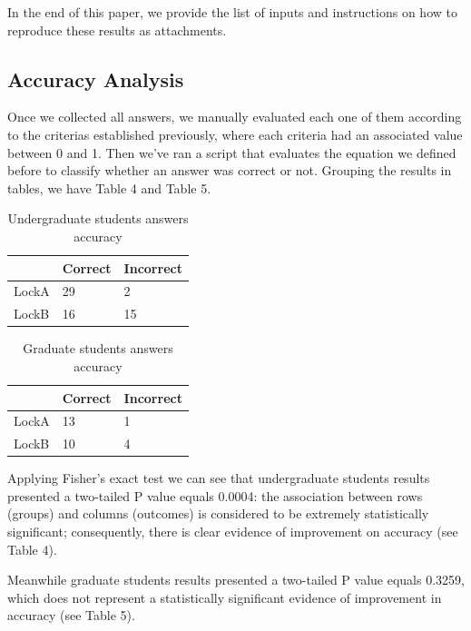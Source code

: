 In the end of this paper, we provide the list of inputs and instructions on how to reproduce these results as attachments.

\subsection{Accuracy Analysis}

Once we collected all answers, we manually evaluated each one of them according to the criterias established previously, where each criteria had an associated value between 0 and 1. Then we've ran a script that evaluates the equation we defined before to classify whether an answer was correct or not. Grouping the results in tables, we have Table 4 and Table 5.

\begin{table}
\begin{center}
\caption{Undergraduate students answers accuracy}
\begin{tabular}{|l|l|l|}
\hline
 & Correct & Incorrect\\
\hline
LockA & 29 & 2\\
LockB & 16 & 15\\
\hline
\end{tabular}
\end{center}
\end{table}

\begin{table}
\begin{center}
\caption{Graduate students answers accuracy}
\begin{tabular}{|l|l|l|}
\hline
 & Correct & Incorrect\\
\hline
LockA & 13 & 1\\
LockB & 10 & 4\\
\hline
\end{tabular}
\end{center}
\end{table}

Applying Fisher's exact test we can see that undergraduate students results presented a two-tailed P value equals 0.0004: the association between rows (groups) and columns (outcomes) is considered to be extremely statistically significant; consequently, there is clear evidence of improvement on accuracy (see Table 4).

Meanwhile graduate students results presented a two-tailed P value equals 0.3259, which does not represent a statistically significant evidence of improvement in accuracy (see Table 5).

